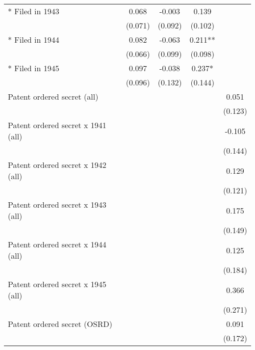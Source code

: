 {\begin{tabular}{l*{4}{c}}
 * Filed in 1943        &       0.068   &      -0.003   &       0.139   &               \\
                        &     (0.071)   &     (0.092)   &     (0.102)   &               \\
 * Filed in 1944        &       0.082   &      -0.063   &       0.211** &               \\
                        &     (0.066)   &     (0.099)   &     (0.098)   &               \\
 * Filed in 1945        &       0.097   &      -0.038   &       0.237*  &               \\
                        &     (0.096)   &     (0.132)   &     (0.144)   &               \\
Patent ordered secret (all)&               &               &               &       0.051   \\
                        &               &               &               &     (0.123)   \\
Patent ordered secret x 1941 (all)&               &               &               &      -0.105   \\
                        &               &               &               &     (0.144)   \\
Patent ordered secret x 1942 (all)&               &               &               &       0.129   \\
                        &               &               &               &     (0.121)   \\
Patent ordered secret x 1943 (all)&               &               &               &       0.175   \\
                        &               &               &               &     (0.149)   \\
Patent ordered secret x 1944 (all)&               &               &               &       0.125   \\
                        &               &               &               &     (0.184)   \\
Patent ordered secret x 1945 (all)&               &               &               &       0.366   \\
                        &               &               &               &     (0.271)   \\
Patent ordered secret (OSRD)&               &               &               &       0.091   \\
                        &               &               &               &     (0.172)   \\

\end{tabular}}
